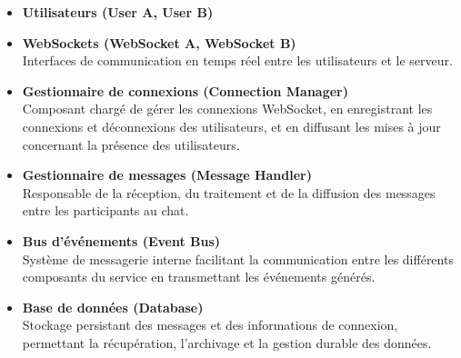 \documentclass{rapportPfe}
\begin{document}
\begin{itemize}
  \item \textbf{Utilisateurs (User A, User B)} \\
  \item \textbf{WebSockets (WebSocket A, WebSocket B)} \\
  Interfaces de communication en temps réel entre les utilisateurs et le serveur.

  \item \textbf{Gestionnaire de connexions (Connection Manager)} \\
  Composant chargé de gérer les connexions WebSocket, en enregistrant les connexions et déconnexions des utilisateurs, et en diffusant les mises à jour concernant la présence des utilisateurs.

  \item \textbf{Gestionnaire de messages (Message Handler)} \\
  Responsable de la réception, du traitement et de la diffusion des messages entre les participants au chat.

  \item \textbf{Bus d’événements (Event Bus)} \\
  Système de messagerie interne facilitant la communication entre les différents composants du service en transmettant les événements générés.

  \item \textbf{Base de données (Database)} \\
  Stockage persistant des messages et des informations de connexion, permettant la récupération, l’archivage et la gestion durable des données.
\end{itemize}
\end{document}
